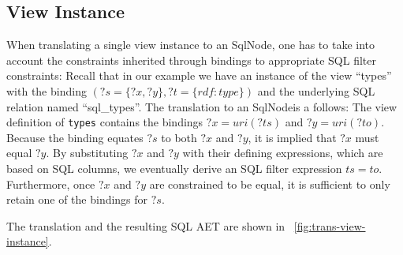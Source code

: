 \documentclass[a4paper,twoside,bibtotoc,abstracton,12pt,BCOR=15mm]{scrreprt}
\begin{document}
\subsection{View Instance}
When translating a single view instance to an SqlNode, one has to take into account the constraints
inherited through bindings to appropriate SQL filter constraints:
Recall that in our example we have an instance of the view ``types'' with the binding $(?s = \{?x, ?y\}, ?t = \{rdf:type\})$
and the underlying SQL relation named ``sql\_types''.
The translation to an SqlNodeis a follows:
The view definition of \texttt{types} contains the bindings $?x = uri(?ts)$ and $?y = uri(?to)$.
Because the binding equates $?s$ to both $?x$ and $?y$, it is implied that $?x$ must equal $?y$. 
By substituting $?x$ and $?y$ with their defining expressions, which are based on SQL columns, we eventually derive an SQL filter expression $ts = to$.
Furthermore, once $?x$ and $?y$ are constrained to be equal, it is sufficient to only retain one of the bindings for $?s$.

The translation and the resulting SQL AET are shown in ~\autoref{fig:trans-view-instance}. 
\end{document}
